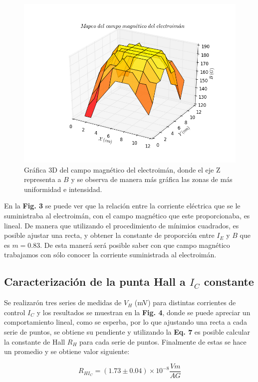 \documentclass[twocolumn,showpacs,preprintnumbers,amsmath,amssymb]{revtex4-1}
\begin{document}
\begin{figure}
\includegraphics[scale=0.46]{figura_8.png}
\caption{\label{fig:epsart}Gráfica 3D del campo magnético del electroimán, donde el eje Z representa a $B$ y se observa de manera
más gráfica las zonas de más uniformidad e intensidad.}
\end{figure}

En la \textbf{Fig. 3} se puede ver que la relación entre la corriente eléctrica que se le suministraba al electroimán, con el
campo magnético que este proporcionaba, es lineal. De manera que utilizando el procedimiento de mínimios cuadrados, es posible
ajustar una recta, y obtener la constante de proporción entre $I_E$ y $B$ que es $m = 0.83$. De esta manerá será posible
saber con que campo magnético trabajamos con sólo conocer la corriente suministrada al electroimán.


\subsection{Caracterización de la punta Hall a $I_C$ constante}

Se realizarón tres series de medidas de $V_H$ (mV) para distintas corrientes de control $I_C$ y los resultados se muestran
en la \textbf{Fig. 4}, donde se puede apreciar un comportamiento lineal, como se esperba, por lo que ajustando una recta a cada
serie de puntos, se obtiene su pendiente y utilizando la \textbf{Eq. 7} es posible calcular la constante de Hall $R_H$ para
cada serie de puntos. Finalmente de estas se hace un promedio y se obtiene valor siguiente:

$$R_{HI_C} = (1.73 \pm 0.04)\times10^{-8} \frac{Vm}{AG}$$
\end{document}
